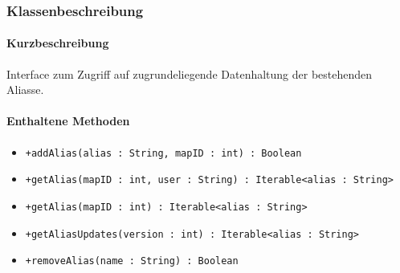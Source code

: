 \subsubsection*{Klassenbeschreibung}%
\paragraph*{Kurzbeschreibung}
Interface zum Zugriff auf zugrundeliegende Datenhaltung der bestehenden Aliasse.
\paragraph*{Enthaltene Methoden}
\begin{itemize}
    \item \texttt{+addAlias(alias : String, mapID : int) : Boolean}
    \item \texttt{+getAlias(mapID : int, user : String) : Iterable<alias : String>}
    \item \texttt{+getAlias(mapID : int) : Iterable<alias : String>}
    \item \texttt{+getAliasUpdates(version : int) : Iterable<alias : String>}
    \item \texttt{+removeAlias(name : String) : Boolean}
\end{itemize}

